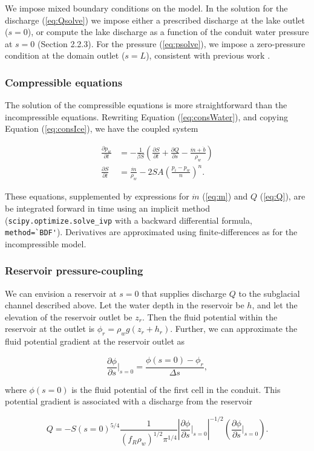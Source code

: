 \documentclass[11pt]{article}
\begin{document}
We impose mixed boundary conditions on the model. In the solution for the discharge (\ref{eq:Qsolve}) we impose either a prescribed discharge at the lake outlet ($s = 0$), or compute the lake discharge as a function of the conduit water pressure at $s = 0$ (Section 2.2.3). For the pressure (\ref{eq:psolve}), we impose a zero-pressure condition at the domain outlet ($s = L$), consistent with previous work \citep{clarke2003, flowers2004}.

\subsubsection{Compressible equations}
The solution of the compressible equations is more straightforward than the incompressible equations. Rewriting Equation (\ref{eq:consWater}), and copying Equation (\ref{eq:consIce}), we have the coupled system
\begin{linenomath*}
\begin{align}
\frac{\partial p_w}{\partial t} &= -\frac{1}{\beta S}\left(\frac{\partial S}{\partial t} + \frac{\partial Q}{\partial s} - \frac{\dot m  + \dot b}{\rho_w}\right) \\
\frac{\partial S}{\partial t} &= \frac{\dot m}{\rho_w} - 2SA\left(\frac{p_i - p_w}{n}\right)^n.
\end{align}
\end{linenomath*}
These equations, supplemented by expressions for $\dot m$ (\ref{eq:m}) and $Q$ (\ref{eq:Q}), are be integrated forward in time using an implicit method (\verb|scipy.optimize.solve_ivp| with a backward differential formula, \verb|method=`BDF'|). Derivatives are approximated using finite-differences as for the incompressible model.

\subsubsection{Reservoir pressure-coupling}
We can envision a reservoir at $s = 0$ that supplies discharge $Q$ to the subglacial channel described above. Let the water depth in the reservoir be $h$, and let the elevation of the reservoir outlet be $z_r$. Then the fluid potential within the reservoir at the outlet is $\phi_r = \rho_w g(z_r + h_r)$. Further, we can approximate the fluid potential gradient at the reservoir outlet as
\begin{linenomath*}
\begin{equation*}
\frac{\partial \phi}{\partial s}\Big\rvert_{s = 0} = \frac{\phi(s = 0) - \phi_r}{\Delta s},
\end{equation*}
\end{linenomath*}
where $\phi(s = 0)$ is the fluid potential of the first cell in the conduit. This potential gradient is associated with a discharge from the reservoir
\begin{linenomath*}
\begin{equation}
\label{eq:Qreservoir}
Q = -S(s=0)^{5/4} \frac{1}{(f_R\rho_w)^{1/2} \pi^{1/4}} \left\lvert \frac{\partial \phi}{\partial s}\big\rvert_{s=0}\right\rvert^{-1/2} \left( \frac{\partial \phi}{\partial s}\Big\rvert_{s=0}\right).
\end{equation}
\end{linenomath*}
\end{document}
